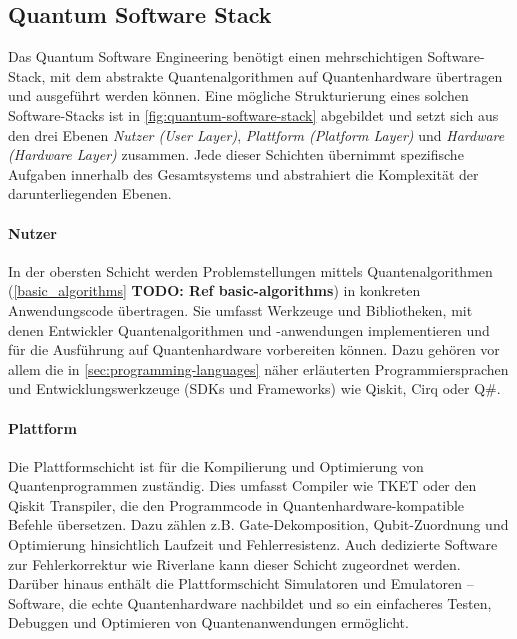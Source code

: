 \subsection{Quantum Software Stack}
\label{sec:quantum-software-stack}

Das Quantum Software Engineering benötigt einen mehrschichtigen Software-Stack, mit dem abstrakte Quantenalgorithmen auf Quantenhardware übertragen und ausgeführt werden können. Eine mögliche Strukturierung eines solchen Software-Stacks ist in \autoref{fig:quantum-software-stack} abgebildet und setzt sich aus den drei Ebenen \emph{Nutzer (User Layer)}, \emph{Plattform (Platform Layer)} und \emph{Hardware (Hardware Layer)} zusammen. Jede dieser Schichten übernimmt spezifische Aufgaben innerhalb des Gesamtsystems und abstrahiert die Komplexität der darunterliegenden Ebenen.
\\
\paragraph{Nutzer}  
In der obersten Schicht werden Problemstellungen mittels Quantenalgorithmen (\autoref{basic_algorithms} \textbf{TODO: Ref basic-algorithms}) in konkreten Anwendungscode übertragen. Sie umfasst Werkzeuge und Bibliotheken, mit denen Entwickler Quantenalgorithmen und -anwendungen implementieren und für die Ausführung auf Quantenhardware vorbereiten können. Dazu gehören vor allem die in \autoref{sec:programming-languages} näher erläuterten Programmiersprachen und Entwicklungswerkzeuge (SDKs und Frameworks) wie Qiskit, Cirq oder Q\#.
\\
\paragraph{Plattform}  
Die Plattformschicht ist für die Kompilierung und Optimierung von Quantenprogrammen zuständig. Dies umfasst Compiler wie TKET oder den Qiskit Transpiler, die den Programmcode in Quantenhardware-kompatible Befehle übersetzen. Dazu zählen z.B. Gate-Dekomposition, Qubit-Zuordnung und Optimierung hinsichtlich Laufzeit und Fehlerresistenz. Auch dedizierte Software zur Fehlerkorrektur wie Riverlane kann dieser Schicht zugeordnet werden. Darüber hinaus enthält die Plattformschicht Simulatoren und Emulatoren -- Software, die echte Quantenhardware nachbildet und so ein einfacheres Testen, Debuggen und Optimieren von Quantenanwendungen ermöglicht.
\\
